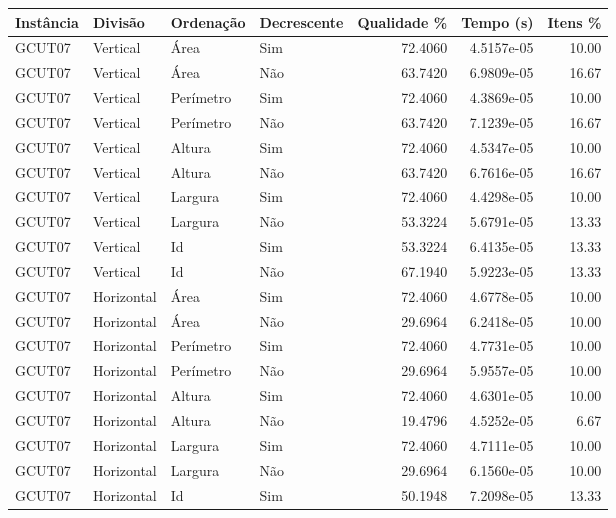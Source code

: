\begin{tabular}{llllrrr}
\hline
Instância & Divisão     & Ordenação & Decrescente & Qualidade \% & Tempo (s)  & Itens \% \\
\hline
GCUT07    & Vertical    & Área      & Sim         & 72.4060      & 4.5157e-05 & 10.00    \\
GCUT07    & Vertical    & Área      & Não         & 63.7420      & 6.9809e-05 & 16.67    \\
GCUT07    & Vertical    & Perímetro & Sim         & 72.4060      & 4.3869e-05 & 10.00    \\
GCUT07    & Vertical    & Perímetro & Não         & 63.7420      & 7.1239e-05 & 16.67    \\
GCUT07    & Vertical    & Altura    & Sim         & 72.4060      & 4.5347e-05 & 10.00    \\
GCUT07    & Vertical    & Altura    & Não         & 63.7420      & 6.7616e-05 & 16.67    \\
GCUT07    & Vertical    & Largura   & Sim         & 72.4060      & 4.4298e-05 & 10.00    \\
GCUT07    & Vertical    & Largura   & Não         & 53.3224      & 5.6791e-05 & 13.33    \\
GCUT07    & Vertical    & Id        & Sim         & 53.3224      & 6.4135e-05 & 13.33    \\
GCUT07    & Vertical    & Id        & Não         & 67.1940      & 5.9223e-05 & 13.33    \\
GCUT07    & Horizontal  & Área      & Sim         & 72.4060      & 4.6778e-05 & 10.00    \\
GCUT07    & Horizontal  & Área      & Não         & 29.6964      & 6.2418e-05 & 10.00    \\
GCUT07    & Horizontal  & Perímetro & Sim         & 72.4060      & 4.7731e-05 & 10.00    \\
GCUT07    & Horizontal  & Perímetro & Não         & 29.6964      & 5.9557e-05 & 10.00    \\
GCUT07    & Horizontal  & Altura    & Sim         & 72.4060      & 4.6301e-05 & 10.00    \\
GCUT07    & Horizontal  & Altura    & Não         & 19.4796      & 4.5252e-05 & 6.67     \\
GCUT07    & Horizontal  & Largura   & Sim         & 72.4060      & 4.7111e-05 & 10.00    \\
GCUT07    & Horizontal  & Largura   & Não         & 29.6964      & 6.1560e-05 & 10.00    \\
GCUT07    & Horizontal  & Id        & Sim         & 50.1948      & 7.2098e-05 & 13.33    \\

\end{tabular}
